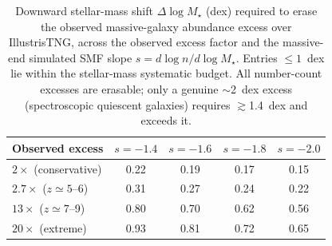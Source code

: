 \begin{table}[t]
\centering
\caption{Downward stellar-mass shift $\Delta\log M_\star$ (dex) required to erase the observed
massive-galaxy abundance excess over IllustrisTNG, across the observed excess factor and the
massive-end simulated SMF slope $s=d\log n/d\log M_\star$. Entries $\le 1$~dex lie within the
stellar-mass systematic budget. All number-count excesses are erasable; only a genuine
$\sim$2~dex excess (spectroscopic quiescent galaxies) requires $\gtrsim$1.4~dex and exceeds it.}
\begin{tabular}{lcccc}
\hline
Observed excess & $s{=}{-}1.4$ & $s{=}{-}1.6$ & $s{=}{-}1.8$ & $s{=}{-}2.0$ \\
\hline
$2\times$ (conservative)     & 0.22 & 0.19 & 0.17 & 0.15 \\
$2.7\times$ ($z{\simeq}5$--6) & 0.31 & 0.27 & 0.24 & 0.22 \\
$13\times$ ($z{\simeq}7$--9)  & 0.80 & 0.70 & 0.62 & 0.56 \\
$20\times$ (extreme)         & 0.93 & 0.81 & 0.72 & 0.65 \\
\hline
\end{tabular}
\end{table}
